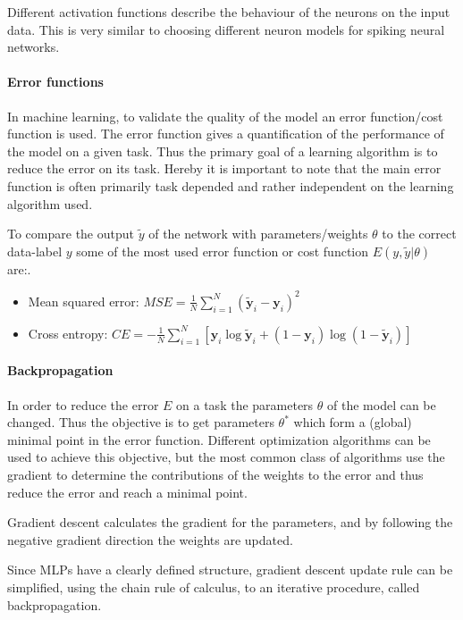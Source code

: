Different activation functions describe the behaviour of the neurons on the input data. This is very similar to choosing different neuron models for spiking neural networks.


\paragraph{Error functions}

In machine learning, to validate the quality of the model an error function/cost function is used.
The error function gives a quantification of the performance of the model on a given task.
Thus the primary goal of a learning algorithm is to reduce the error on its task.
Hereby it is important to note that the main error function is often primarily task depended and rather independent on the learning algorithm used.  

To compare the output $\tilde{y}$ of the network with parameters/weights $\theta$ to the correct data-label $y$ some of the most used error function or cost function $E(y,\tilde{y} | \theta)$ are:.

\begin{itemize}
	\item Mean squared error: $MSE = \frac{1}{N} \sum_{i=1}^N (\tilde{\textbf{y}}_i - \textbf{y}_i)^2 $
	\item Cross entropy: $CE = - \frac{1}{N} \sum_{i=1}^N [ \textbf{y}_i \log \tilde{\textbf{y}}_i + (1 - \textbf{y}_i) \log (1 - \tilde{\textbf{y}}_i)]$
\end{itemize}

\paragraph{Backpropagation}

In order to reduce the error $E$ on a task the parameters $\theta$ of the model can be changed.
Thus the objective is to get parameters $\theta^*$ which form a (global) minimal point in the error function. 
Different optimization algorithms can be used to achieve this objective, but the most common class of algorithms use the gradient to determine the contributions of the weights to the error and thus reduce the error and reach a minimal point.

Gradient descent calculates the gradient for the parameters, and by following the negative gradient direction the weights are updated.

Since MLPs have a clearly defined structure, gradient descent update rule can be simplified, using the chain rule of calculus, to an iterative procedure, called backpropagation.

